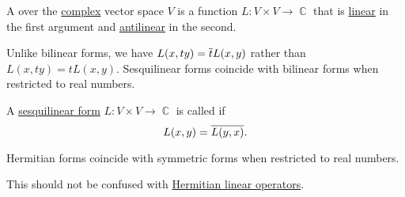 \begin{definition}\label{def:sesquilinear_form}
  A  over the \hyperref[def:complex_numbers]{complex} vector space \( V \) is a function \( L: V \times V \to \BbbC \) that is \hyperref[def:linear_function]{linear} in the first argument and \hyperref[def:antilinear_function]{antilinear} in the second.

  Unlike bilinear forms, we have \( L(x, ty) = \oline t L(x, y) \) rather than \( L(x, ty) = t L(x, y) \). Sesquilinear forms coincide with bilinear forms when restricted to real numbers.
\end{definition}

\begin{definition}\label{def:hermitian_form}
  A \hyperref[def:sesquilinear_form]{sesquilinear form} \( L: V \times V \to \BbbC \) is called  if
  \begin{equation*}
    L(x, y) = \oline{L(y, x)}.
  \end{equation*}

  Hermitian forms coincide with symmetric forms when restricted to real numbers.

  This should not be confused with \hyperref[def:adjoint_operator]{Hermitian linear operators}.
\end{definition}

